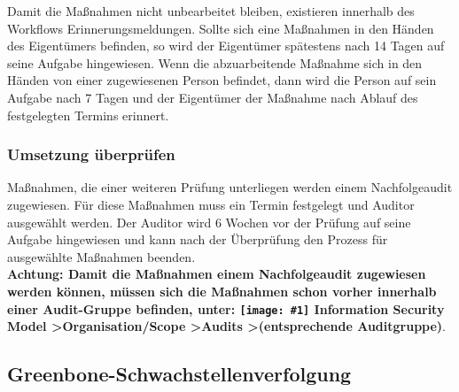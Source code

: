 \documentclass[a4paper,10pt]{book}
\newcommand{\icon}[1]{\texttt{[image: \#1]}}
\begin{document}
Damit die Maßnahmen nicht unbearbeitet bleiben, existieren innerhalb des Workflows Erinnerungsmeldungen. Sollte sich eine Maßnahmen in den Händen des
Eigentümers befinden, so wird der Eigentümer spätestens nach 14 Tagen auf seine Aufgabe hingewiesen. Wenn die abzuarbeitende Maßnahme sich in den Händen von
einer zugewiesenen Person befindet, dann wird die Person auf sein Aufgabe nach 7 Tagen und der Eigentümer der Maßnahme nach Ablauf des festgelegten Termins
erinnert.

\subsubsection{Umsetzung überprüfen}
Maßnahmen, die einer weiteren Prüfung unterliegen werden einem Nachfolgeaudit zugewiesen. Für diese Maßnahmen muss ein Termin festgelegt und Auditor ausgewählt
werden. Der Auditor wird 6 Wochen vor der Prüfung auf seine Aufgabe hingewiesen und kann nach der Überprüfung den Prozess für ausgewählte Maßnahmen beenden.
\newline\\
\textbf{Achtung: Damit die Maßnahmen einem Nachfolgeaudit zugewiesen werden können, müssen sich die Maßnahmen schon vorher innerhalb einer Audit-Gruppe befinden,
unter: \textbf {\icon{Icon/Informationssicherheitsmodell.png} Information Security Model \textgreater Organisation/Scope \textgreater Audits
\textgreater (entsprechende Auditgruppe)}}.

\subsection{Greenbone-Schwachstellenverfolgung}
\label{sec:workflow:greenbone-schwachstellenverfolgung}
\end{document}
